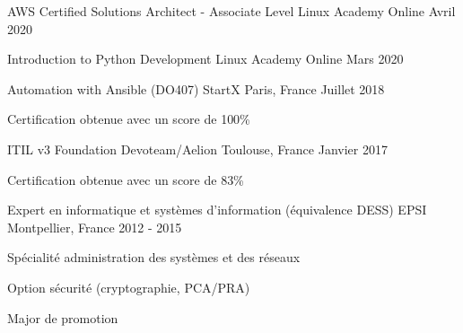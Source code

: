 

\begin{cventries}

  \cventry
    {AWS Certified Solutions Architect - Associate Level} %
    {Linux Academy} %
    {Online} %
    {Avril 2020} %
    {}

  \cventry
    {Introduction to Python Development} %
    {Linux Academy} %
    {Online} %
    {Mars 2020} %
    {}

  \cventry
    {Automation with Ansible (DO407)} %
    {StartX} %
    {Paris, France} %
    {Juillet 2018} %
    {
      \begin{cvitems} %
        \item {Certification obtenue avec un score de 100\%}
      \end{cvitems}
    }

\cventry
  {ITIL v3 Foundation} %
  {Devoteam/Aelion} %
  {Toulouse, France} %
  {Janvier 2017} %
  {
    \begin{cvitems} %
      \item {Certification obtenue avec un score de 83\%}
    \end{cvitems}
  }

\cventry
  {Expert en informatique et systèmes d'information (équivalence DESS)} %
  {EPSI} %
  {Montpellier, France} %
  {2012 - 2015} %
  {
    \begin{cvitems} %
      \item {Spécialité administration des systèmes et des réseaux}
      \item {Option sécurité (cryptographie, PCA/PRA)}
      \item {Major de promotion}
    \end{cvitems}
  }


\end{cventries}
